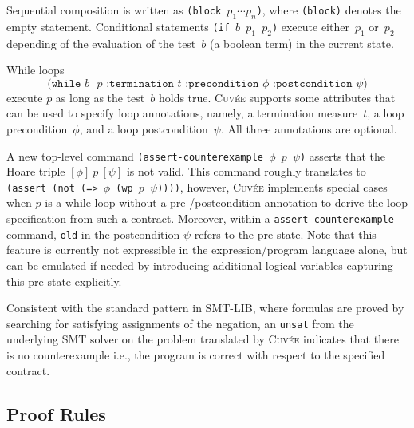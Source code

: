 \documentclass[fleqn]{llncs}
\newcommand{\Cuvee}{\textsc{Cuvée}\xspace}
\newcommand{\code}[1]{\texttt{#1}}
\newcommand{\hoaretotal}[3]{[ #1 ]~#2~[ #3 ]}
\begin{document}
Sequential composition is written as \code{(block $p_1 \cdots p_n$)}, where \code{(block)} denotes the empty statement.
Conditional statements \code{(if $b$ $p_1$ $p_2$)} execute either~$p_1$ or~$p_2$ depending of the evaluation of the test~$b$ (a boolean term) in the current state.

\medskip
\noindent
While loops
\[ \code{(while $b$ $p$ :termination $t$ :precondition $\phi$ :postcondition $\psi$)} \]
execute $p$ as long as the test~$b$ holds true.
\Cuvee supports some attributes that can be used to specify loop annotations,
namely, a termination measure~$t$, a loop precondition~$\phi$, and a loop postcondition~$\psi$.
All three annotations are optional.

\medskip

A new top-level command \code{(assert-counterexample $\phi$ $p$ $\psi$)}
asserts that the Hoare triple $\hoaretotal{\phi}{p}{\psi}$ is not valid.
This command roughly translates to \code{(assert (not (=> $\phi$ (wp $p$ $\psi$))))},
however, \Cuvee implements special cases when $p$ is a while loop without a pre-/postcondition annotation
to derive the loop specification from such a contract.
Moreover, within a \code{assert-counterexample} command,
\code{old} in the postcondition $\psi$ refers to the pre-state.
Note that this feature is currently not expressible in the expression/program language alone,
but can be emulated if needed by introducing additional logical variables capturing this pre-state explicitly.

Consistent with the standard pattern in SMT-LIB, where formulas are proved by searching for satisfying assignments of the negation,
an \code{unsat} from the underlying SMT solver on the problem translated by \Cuvee indicates that there is no counterexample
i.e., the program is correct with respect to the specified contract.

\subsection{Proof Rules}
\label{sec:semantics}
\end{document}
